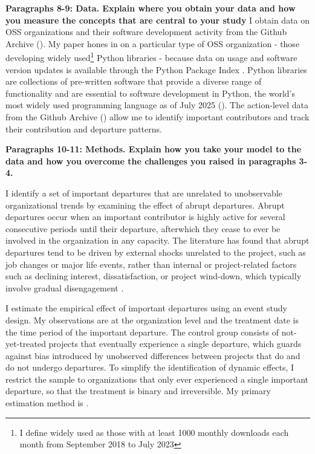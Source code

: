 \documentclass[12pt,notitlepage]{article}
\begin{document}
\textbf{Paragraphs 8-9: Data. Explain where you obtain your data and how you measure the concepts that
are central to your study}
I obtain data on OSS organizations and their software development activity from the Github Archive (\cite{github_archive_github_2025}). My paper hones in on a particular type of OSS organization - those developing widely used\footnote{I define widely used as those with at least 1000 monthly downloads each month from September 2018 to July 2023} Python libraries - because data on usage and software version updates is available through the Python Package Index . Python libraries are collections of pre-written software that provide a diverse range of functionality and are essential to software development in Python, the world's most widely used programming language as of July 2025 (\cite{paul_jansen_tiobe_2025}). The action-level data from the Github Archive (\cite{github_archive_github_2025}) allow me to identify important contributors and track their contribution and departure patterns. 


\textbf{Paragraphs 10-11: Methods. Explain how you take your model to the data and how you overcome the
challenges you raised in paragraphs 3-4.}

I identify a set of important departures that are unrelated to unobservable organizational trends by examining the effect of abrupt departures. Abrupt departures occur when an important contributor is highly active for several consecutive periods until their departure, afterwhich they cease to ever be involved in the organization in any capacity. The literature has found that abrupt departures tend to be driven by external shocks unrelated to the project, such as job changes or major life events, rather than internal or project-related factors such as declining interest, dissatisfaction, or project wind-down, which typically involve gradual disengagement  \cite{miller_why_2019}. 

I estimate the empirical effect of important departures using an event study design. My observations are at the organization level and the treatment date is the time period of the important departure. The control group consists of not-yet-treated projects that eventually experience a single departure, which guards against bias introduced by unobserved differences between projects that do and do not undergo departures. To simplify the identification of dynamic effects, I restrict the sample to organizations that only ever experienced a single important departure, so that the treatment is binary and irreversible. My primary estimation method is \cite{callaway_difference--differences_2021}. 
\end{document}
